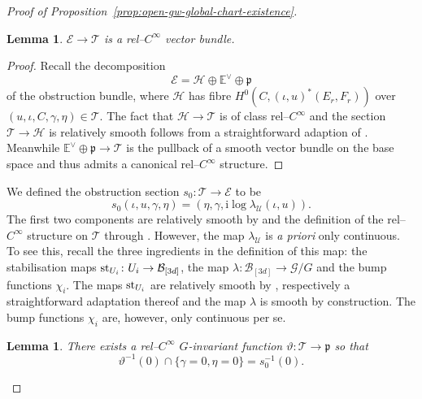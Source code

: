 \documentclass[11pt,psamsfonts, oneside, reqno]{amsart}
\newcommand{\inv}{^{-1}}
\newcommand{\cl}{\colon}
\newcommand{\dul}{^\vee}
\newcommand{\bE}{\mathbb{E}}
\newcommand{\cB}{\mathcal{B}}
\newcommand{\cE}{\mathcal{E}}
\newcommand{\cG}{\mathcal{G}}
\newcommand{\cH}{\mathcal{H}}
\newcommand{\cT}{\mathcal{T}}
\newcommand{\cU}{\mathcal{U}}
\newcommand{\fp}{\mathfrak{p}}
\newcommand{\hodge}{\bE\dul}
\newcommand{\obs}{s}
\newcommand{\stb}{\normalfont\text{st}}
\newtheorem{lemma}[theorem]{Lemma}
\theoremstyle{definition}
\theoremstyle{remark}
\numberwithin{equation}{section}
\begin{document}
\begin{proof}[Proof of Proposition~\ref{prop:open-gw-global-chart-existence}]
\begin{lemma}\label{} $\cE\to \cT$ is a rel--$C^\infty$ vector bundle.
\end{lemma}

\begin{proof}Recall the decomposition 
	\begin{equation}\label{eq:obs-bundle} \cE = \cH\oplus \hodge \oplus \fp\end{equation} of the obstruction bundle, where $\cH$ has fibre $H^0(C,(\iota,u)^*(E_r,F_r))$ over $(u,\iota,C,\gamma,\eta)\in \cT$. 
	 The fact that $\cH \to \cT$ is of class rel--$C^\infty$ and the section $\cT\to \cH$ is relatively smooth follows from a straightforward adaption of \cite[Theorem~2.22]{HS22}. Meanwhile $\hodge \oplus \fp \to \cT$ is the pullback of a smooth vector bundle on the base space and thus admits a canonical rel--$C^\infty$ structure.
\end{proof}

\noindent
We defined the obstruction section $\obs_0 \cl \cT\to \cE$ to be 
$$\obs_0(\iota,u,\gamma,\eta) =(\eta,\gamma,\text{i}\log\lambda_\cU(\iota,u)).$$\noindent
The first two components are relatively smooth by \cite[Theorem~2.22]{HS22} and the definition of the rel--$C^\infty$ structure on $\cT$ through \cite[Proposition~5.6]{HS22}. However, the map $\lambda_\cU$ is \textit{a priori} only continuous. To see this, recall the three ingredients in the definition of this map: the stabilisation maps $\stb_{U_i}\cl U_i \to \cB_{[3d]}$, the map $\lambda\cl\cB_{[3d]}\to \cG/G$ and the bump functions $\chi_i$. The maps $\stb_{U_i}$ are relatively smooth by \cite[Proposition~5.7]{HS22}, respectively a straightforward adaptation thereof and the map $\lambda$ is smooth by construction. The bump functions $\chi_i$ are, however, only continuous per se.

\begin{lemma}\label{lem:mollification-of-obstruction-section} There exists a rel--$C^\infty$ $G$-invariant function $\vartheta \cl \cT\to \fp$ so that $$\vartheta\inv(0)\cap \{\gamma = 0,\eta = 0\} = \obs_0\inv(0).$$
\end{lemma}


\end{proof}
\end{document}
